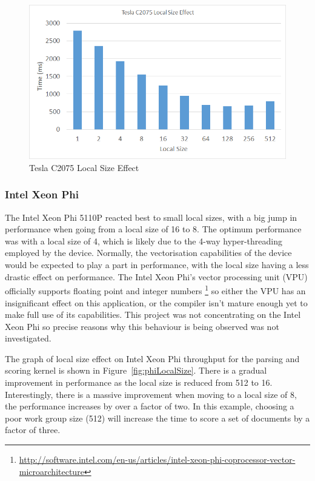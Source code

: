 \begin{figure}[H]
\includegraphics[width=\linewidth]{images/teslaLocalSize.png}
\caption{Tesla C2075 Local Size Effect}
\label{fig:teslaLocalSize}
\end{figure}

\subsubsection{Intel Xeon Phi}

The Intel Xeon Phi 5110P reacted best to small local sizes, with a big jump in
performance when going from a local size of 16 to 8. The optimum performance was
with a local size of 4, which is likely due to the 4-way hyper-threading
employed by the device. Normally, the vectorisation capabilities of the device
would be expected to play a part in performance, with the local size having a
less drastic effect on performance. The Intel Xeon Phi's vector processing unit
(VPU) officially supports floating point and integer numbers
\footnote{\url{http://software.intel.com/en-us/articles/intel-xeon-phi-coprocessor-vector-microarchitecture}}
so either the VPU has an insignificant effect on this application, or the
compiler isn't mature enough yet to make full use of its capabilities. This
project was not concentrating on the Intel Xeon Phi so precise reasons why this
behaviour is being observed was not investigated.

The graph of local size effect on Intel Xeon Phi throughput for the parsing and
scoring kernel is shown in Figure~\ref{fig:phiLocalSize}. There is a gradual
improvement in performance as the local size is reduced from 512 to 16.
Interestingly, there is a massive improvement when moving to a local size of 8,
the performance increases by over a factor of two. In this example, choosing a
poor work group size (512) will increase the time to score a set of documents by
a factor of three.

